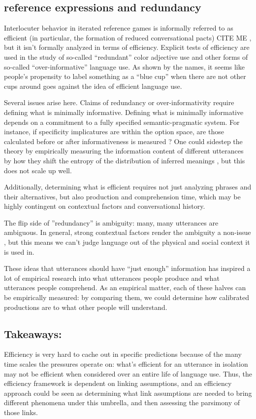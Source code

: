 \documentclass[]{article}
\begin{document}
\subsection{reference expressions and redundancy}
Interlocuter behavior in iterated reference games is informally referred to as efficient (in particular, the formation of reduced conversational pacts) CITE ME , but it isn't formally analyzed in terms of efficiency. Explicit tests of efficiency are used in the study of so-called  ``redundant'' color adjective use and other forms of so-called ``over-informative'' language use. As shown by the names, it seems like people's propensity to label something as a ``blue cup'' when there are not other cups around goes against the idea of efficient language use. 

Several issues arise here. Claims of redundancy or over-informativity require defining what is minimally informative. Defining what is minimally informative depends on a commitment to a fully specified semantic-pragmatic system. For instance, if specificity implicatures are within the option space, are those calculated before or after informativeness is measured \cite{bergen}? One could sidestep the theory by empirically measuring the information content of different utterances by how they shift the entropy of the distribution of inferred meanings \cite{degen20200406}, but this does not scale up well. 

Additionally, determining what is efficient requires not just analyzing phrases and their alternatives, but also production and comprehension time, which may be highly contingent on contextual factors and conversational history. 

The flip side of ''redundancy'' is ambiguity: many, many utterances are ambiguous. In general, strong contextual factors render the ambiguity a non-issue \cite{piantadosi2012}, but this means we can't judge language out of the physical and social context it is used in. 

These ideas that utterances should have ``just enough'' information has inspired a lot of empirical research into what utterances people produce and what utterances people comprehend. As an empirical matter, each of these halves can be empirically measured: by comparing them, we could determine how calibrated productions are to what other people will understand. 



\subsection{Takeaways:}
Efficiency is very hard to cache out in specific predictions because of the many time scales the pressures operate on: what's efficient for an utterance in isolation may not be efficient when considered over an entire life of language use. Thus, the efficiency framework is dependent on linking assumptions, and an efficiency approach could be seen as determining what link assumptions are needed to bring different phenomena under this umbrella, and then assessing the parsimony of those links.
\end{document}
